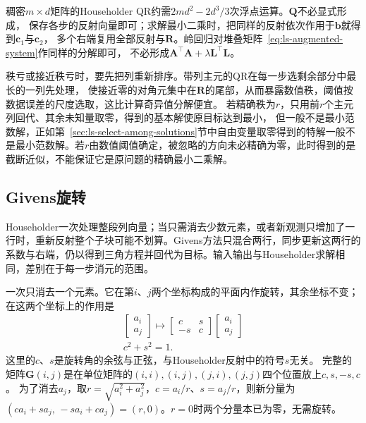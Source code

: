 稠密$m\times d$矩阵的Householder QR约需$2md^2-2d^3/3$次浮点运算。$\bm Q$不必显式形成，
保存各步的反射向量即可；求解最小二乘时，把同样的反射依次作用于$\bm b$就得到$\bm c_1$与$\bm c_2$，
多个右端复用全部反射与$\bm R$。岭回归对堆叠矩阵~\eqref{eq:ls-augmented-system}作同样的分解即可，
不必形成$\bm A^\top\bm A+\lambda\bm L^\top\bm L$。

秩亏或接近秩亏时，要先把列重新排序。带列主元的QR在每一步选剩余部分中最长的一列先处理，
使接近零的对角元集中在$\bm R$的尾部，从而暴露数值秩，阈值按数据误差的尺度选取，这比计算奇异值分解便宜。
若精确秩为$r$，只用前$r$个主元列回代、其余未知量取零，得到的基本解使原目标达到最小，
但一般不是最小范数解，正如第~\ref{sec:ls-select-among-solutions}节中自由变量取零得到的特解一般不是最小范数解。若$r$由数值阈值确定，被忽略的方向未必精确为零，此时得到的是截断近似，不能保证它是原问题的精确最小二乘解。

\subsection{Givens旋转}

Householder一次处理整段列向量；当只需消去少数元素，或者新观测只增加了一行时，重新反射整个子块可能不划算。Givens方法只混合两行，同步更新这两行的系数与右端，仍以得到三角方程并回代为目标。输入输出与Householder求解相同，差别在于每一步消元的范围。

一次只消去一个元素。它在第$i$、$j$两个坐标构成的平面内作旋转，其余坐标不变；
在这两个坐标上的作用是
\begin{equation}
\begin{gathered}
\begin{bmatrix}a_i\\a_j\end{bmatrix}\mapsto
 \begin{bmatrix}c&s\\-s&c\end{bmatrix}
 \begin{bmatrix}a_i\\a_j\end{bmatrix}\\
c^2+s^2=1.
\end{gathered}
\label{eq:ls-givens}
\end{equation}
这里的$c$、$s$是旋转角的余弦与正弦，与Householder反射中的符号$s$无关。
完整的矩阵$\bm G(i,j)$是在单位矩阵的$(i,i),(i,j),(j,i),(j,j)$四个位置放上$c,s,-s,c$。
为了消去$a_j$，取$r=\sqrt{a_i^2+a_j^2}$，$c=a_i/r$、$s=a_j/r$，则新分量为
$(ca_i+sa_j,\,-sa_i+ca_j)=(r,0)$。$r=0$时两个分量本已为零，无需旋转。

